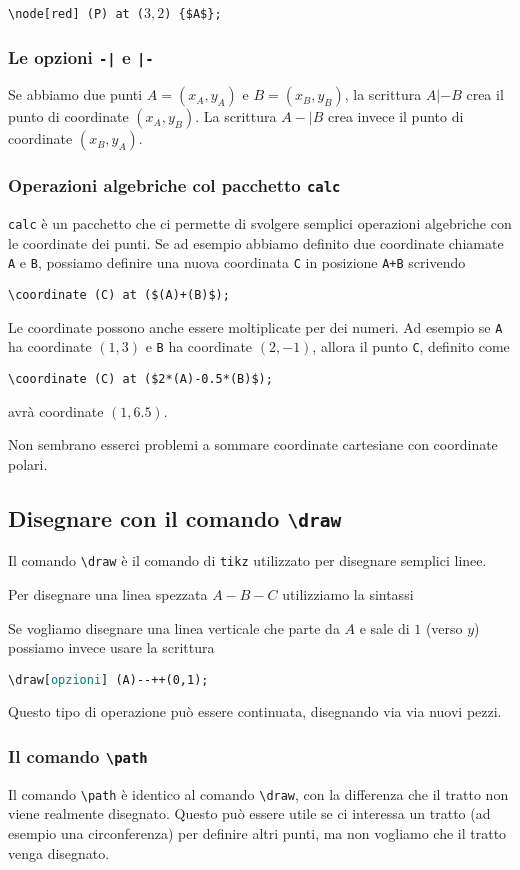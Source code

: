 \documentclass[italian, a4paper]{article}
\newcommand{\bs}{\textbackslash}
\newcommand{\ttt}[1]{\texttt{#1}}
\newcommand{\dash}{{-}{-}}
\newcommand{\comandons}[2][\large]{\vspace*{1mm}\noindent\fbox{\parbox{\textwidth}{#1\ttt{#2}}}}
\newcommand{\comando}[2][\large]{\comandons[#1]{#2}\vspace*{3mm}}
\newcommand{\blue}[1]{\textcolor{blue}{#1}}
\newcommand{\opzioni}{\textcolor{teal}{\ttt{opzioni}}}
\begin{document}
\ttt{\bs node[red] (P) at ($3,2$) \{\$A\$\};}

\subsubsection{Le opzioni \ttt{-|} e \ttt{|-}}
Se abbiamo due punti $A=(x_A,y_A)$ e $B=(x_B,y_B)$, la scrittura $A|-B$ crea il punto di coordinate $(x_A,y_B)$. La scrittura $A-|B$ crea invece il punto di coordinate $(x_B,y_A)$.

\subsubsection{Operazioni algebriche col pacchetto \ttt{calc}}
\ttt{calc} è un pacchetto che ci permette di svolgere semplici operazioni algebriche con le coordinate dei punti. Se ad esempio abbiamo definito due coordinate chiamate \ttt{A} e \ttt{B}, possiamo definire una nuova coordinata \ttt{C} in posizione \ttt{A+B} scrivendo

\ttt{\bs coordinate (C) at (\$(A)+(B)\$);}

Le coordinate possono anche essere moltiplicate per dei numeri. Ad esempio se \ttt{A} ha coordinate $(1,3)$ e \ttt{B} ha coordinate $(2,-1)$, allora il punto \ttt{C}, definito come

\ttt{\bs coordinate (C) at (\$2*(A)-0.5*(B)\$);}

avrà coordinate $(1,6.5)$.

Non sembrano esserci problemi a sommare coordinate cartesiane con coordinate polari.

\subsection{Disegnare con il comando \ttt{\bs draw}}
Il comando \ttt{\bs draw} è il comando di \ttt{tikz} utilizzato per disegnare semplici linee.

Per disegnare una linea spezzata $A-B-C$ utilizziamo la sintassi

\comando{\bs draw[\opzioni] (\blue{A})\dash(\blue{B})\dash(\blue{C});}

Se vogliamo disegnare una linea verticale che parte da $A$ e sale di $1$ (verso $y$) possiamo invece usare la scrittura

\ttt{\bs draw[\opzioni] (A)\dash++(0,1);}

Questo tipo di operazione può essere continuata, disegnando via via nuovi pezzi.

\subsubsection{Il comando \ttt{\bs path}}
Il comando \ttt{\bs path} è identico al comando \ttt{\bs draw}, con la differenza che il tratto non viene realmente disegnato. Questo può essere utile se ci interessa un tratto (ad esempio una circonferenza) per definire altri punti, ma non vogliamo che il tratto venga disegnato.
\end{document}
